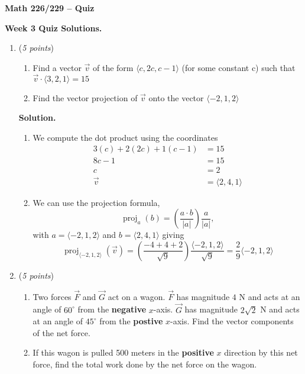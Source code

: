 \documentclass[12 pt]{article}
\begin{document}
	\begin{center}
		\textbf{\hfill Math 226/229 -- Quiz} \\
	\end{center}
	\medskip

	\noindent
	\textbf{Week 3 Quiz Solutions.} \hfill
	\vspace{.1in}
	\hspace*{0.2in}
	\medskip
	\noindent
	\begin{enumerate}
    \item (\textit{5 points})
    \begin{enumerate}
	  \item Find a vector $\vec{v}$ of the form $\langle c, 2c, c-1\rangle$ (for some constant c)
      such that $\vec{v} \cdot \langle 3, 2, 1\rangle = 15$
	  \item Find the vector projection of $\vec{v}$ onto the vector $\langle -2, 1, 2\rangle$
	\end{enumerate}
    \textbf{Solution.}
    \begin{enumerate}
      \item We compute the dot product using the coordinates \begin{align*}
        3(c) + 2(2c) + 1(c-1) &= 15 \\
        8c-1 &= 15 \\
        c &= 2 \\
        \vec{v} &= \langle 2, 4, 1 \rangle
      \end{align*}
      \item We can use the projection formula, \[
        \operatorname{proj}_a(b) = \left(\frac{a \cdot b}{|a|}\right)\frac{a}{|a|},
      \] with $a = \langle -2, 1, 2\rangle$ and $b = \langle 2, 4, 1 \rangle$ giving \[
        \operatorname{proj}_{\langle -2, 1, 2\rangle}(\vec v)
        = \left(\frac{-4 + 4 + 2}{\sqrt{9}}\right)\frac{\langle -2, 1, 2\rangle}{\sqrt{9}}
        = \frac{2}{9}\langle -2, 1, 2\rangle
      \]
    \end{enumerate}
		\item (\textit{5 points})
		\begin{enumerate}
			\item Two forces $\vec{F}$ and $\vec{G}$ act on a wagon. $\vec{F}$ has magnitude $4$ N and acts at an angle of $60^\circ$ from the \textbf{negative} $x$-axis. $\vec{G}$ has magnitude  $2\sqrt2$ N and acts at an angle of $45^\circ$ from the \textbf{postive} $x$-axis. Find the vector components of the net force.
			\item If this wagon is pulled 500 meters in the \textbf{positive} $x$ direction by this net force, find the total work done by the net force on the wagon.

\end{enumerate}
\end{enumerate}
\end{document}
